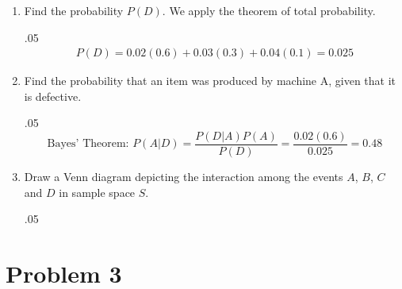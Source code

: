 \documentclass[11pt,twoside]{article}
\newcommand{\pts}[1]{\marginpar{ \small\hspace{0pt} \textit{[#1]} } }
\newcommand{\?}{\stackrel{?}{=}}
\newcommand{\fr}{\frac}
\newcommand{\bl}{\color{blue}}
\newenvironment{solution}{\begin{adjustwidth}{.05\textwidth}{}\bl}{\medskip\end{adjustwidth}}
\begin{document}
\begin{enumerate}[\bf (a)]
 \item Find the probability $P(D)$. {\bl We apply the theorem of total probability.} \pts{3}
  \begin{solution}
       \begin{align*}
        P(D) = 0.02(0.6) + 0.03(0.3) + 0.04(0.1) = \boxed{0.025}
      \end{align*}
\end{solution}
  \item Find the \pts{3} probability that an item was produced by machine A, given that it is defective.
    \begin{solution}
      \begin{equation*}
        \text{Bayes' Theorem: }        P(A|D) = \fr{P(D|A)P(A)}{P(D)} = \fr{0.02(0.6)}{0.025}  = \boxed{0.48}
      \end{equation*}      
    \end{solution}
  \item Draw a Venn \pts{3} diagram depicting the interaction among the events $A$, $B$, $C$ and $D$ in sample space $S$.
    \begin{solution}
  \begin{center}
\end{center}
\end{solution}
\end{enumerate}
 

 
\section*{Problem 3}
 
\end{document}
